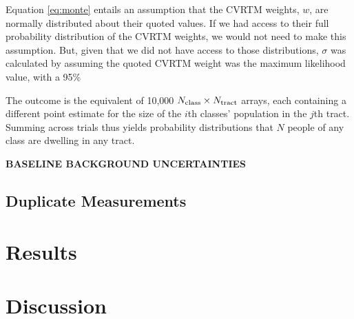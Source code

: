 \documentclass[11pt]{article}
\def\bfr{\bf\color{red}}
\begin{document}
Equation \ref{eq:monte} entails an assumption that the CVRTM weights, $w$, are normally distributed 
about their quoted values. If we had access to their full probability distribution of the CVRTM weights, we 
would not need to make this assumption. But, given that we did not have access to those distributions, $\sigma$
was calculated by assuming the quoted CVRTM weight was the maximum likelihood value, with a 95\%

The outcome is the equivalent of 10,000 $N_{\rm class}\times N_{\rm tract}$ arrays, each containing a different
point estimate for the size of the $i$th classes' population in the $j$th tract. Summing across trials thus
yields probability distributions that $N$ people of any class are dwelling in any tract.

{\bfr BASELINE BACKGROUND UNCERTAINTIES}

\subsection{Duplicate Measurements}
\label{sec:dupes}

\section{Results}
\label{sec:results}

\section{Discussion}
\label{sec:discussion}
\end{document}
